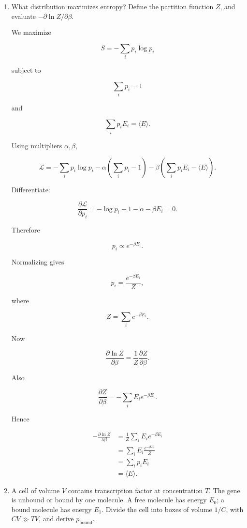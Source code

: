 \documentclass[11pt]{article}
\begin{document}
\begin{enumerate}

\item What distribution maximizes entropy? Define the partition function
\(Z\), and evaluate \(-\partial\ln Z/\partial\beta\).

We maximize

\[
S=-\sum_i p_i\log p_i
\]

subject to

\[
\sum_i p_i=1
\]

and

\[
\sum_i p_iE_i=\langle E\rangle.
\]

Using multipliers \(\alpha,\beta\),

\[
\mathcal L
=
-\sum_i p_i\log p_i
-\alpha\left(\sum_i p_i-1\right)
-\beta\left(\sum_i p_iE_i-\langle E\rangle\right).
\]

Differentiate:

\[
\frac{\partial\mathcal L}{\partial p_i}
=
-\log p_i-1-\alpha-\beta E_i=0.
\]

Therefore

\[
p_i\propto e^{-\beta E_i}.
\]

Normalizing gives

\[
p_i=\frac{e^{-\beta E_i}}{Z},
\]

where

\[
Z=\sum_i e^{-\beta E_i}.
\]

Now

\[
\frac{\partial\ln Z}{\partial\beta}
=
\frac1Z\frac{\partial Z}{\partial\beta}.
\]

Also

\[
\frac{\partial Z}{\partial\beta}
=
-\sum_i E_i e^{-\beta E_i}.
\]

Hence

\begin{align*}
-\frac{\partial\ln Z}{\partial\beta}
&=
\frac{1}{Z}
\sum_i E_i e^{-\beta E_i} \\
&=
\sum_i E_i
\frac{e^{-\beta E_i}}{Z} \\
&=
\sum_i p_iE_i \\
&=
\langle E\rangle.
\end{align*}

\item A cell of volume \(V\) contains transcription factor at concentration
\(T\). The gene is unbound or bound by one molecule. A free molecule has
energy \(E_0\); a bound molecule has energy \(E_1\). Divide the cell into
boxes of volume \(1/C\), with \(CV\gg TV\), and derive
\(p_{\mathrm{bound}}\).


\end{enumerate}
\end{document}
